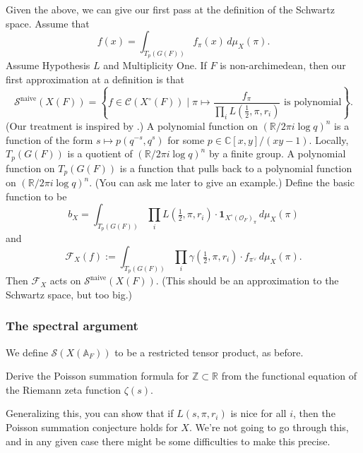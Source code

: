 \documentclass[reqno]{amsart} 
\numberwithin{theorem}{section}
\numberwithin{equation}{section}
\numberwithin{exercise}{section}
\begin{document}
Given the above, we can give our first pass at the definition of the Schwartz space.  Assume that
\begin{equation*}
  f(x) = \int_{T_p(G(F))}
  f_\pi(x)
  \, d \mu_X(\pi).
\end{equation*}
Assume Hypothesis $L$ and Multiplicity One.  If $F$ is non-archimedean, then our first approximation at a definition is that
\begin{equation*}
  \mathcal{S}^{\text{naive}}(X(F))
  =
  \left\{ f \in \mathcal{C}(X^{\circ}(F)) \mid \pi \mapsto \frac{f_\pi}{\prod_i L(\frac{1}{2}, \pi, r_i)} \text{ is polynomial} \right\}.
\end{equation*}
(Our treatment is inspired by \cite[\S2.6]{2015arXiv150601452B}.)  A polynomial function on $(\mathbb{R} / 2 \pi i \log q)^n$ is a function of the form $s \mapsto p(q^{- s}, q^{s})$ for some $p \in \mathbb{C}[x, y] /(x y - 1)$.  Locally, $T_p(G(F))$ is a quotient of $(\mathbb{R} / 2 \pi i \log q)^n$ by a finite group.  A polynomial function on $T_p(G(F))$ is a function that pulls back to a polynomial function on $(\mathbb{R} / 2 \pi i \log q)^n$.  (You can ask me later to give an example.)  Define the basic function to be
\begin{equation*}
  b_X = \int_{T_p(G(F))}
  \prod_i L(\tfrac{1}{2}, \pi, r_i)
  \cdot 
  \mathbf{1}_{X^{\circ}(\mathcal{O}_F)_\pi}
  \, d \mu_X(\pi)
\end{equation*}
and
\begin{equation*}
  \mathcal{F}_X(f) := \int_{T_p(G(F))} \prod_i \gamma(\tfrac{1}{2}, \pi, r_i) \cdot f_{\pi^\vee}
  \, d \mu_X(\pi).
\end{equation*}
Then $\mathcal{F}_X$ acts on $\mathcal{S}^{\text{naive}}(X(F))$.  (This should be an approximation to the Schwartz space, but too big.)

\subsubsection{The spectral argument}\label{sec:cq6txpqe90}

We define $\mathcal{S}(X(\mathbb{A}_F))$ to be a restricted tensor product, as before.
\begin{exercise}\label{exercise:cq6txpqdmd}
  Derive the Poisson summation formula for $\mathbb{Z} \subset \mathbb{R}$ from the functional equation of the Riemann zeta function $\zeta(s)$.
\end{exercise}
Generalizing this, you can show that if $L(s, \pi, r_i)$ is nice for all $i$, then the Poisson summation conjecture holds for $X$.  We're not going to go through this, and in any given case there might be some difficulties to make this precise.
\end{document}
